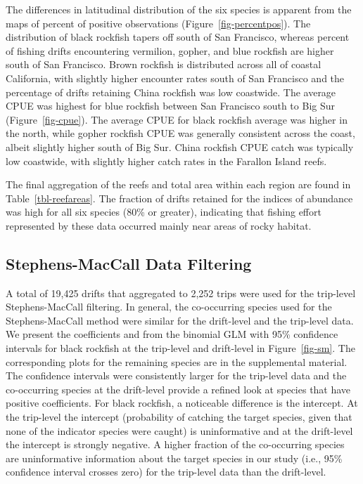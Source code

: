 \documentclass[
  12pt,
  authoryear,
  preprint,
  3p]{elsarticle}
\begin{document}
The differences in latitudinal distribution of the six species is
apparent from the maps of percent of positive observations
(Figure~\ref{fig-percentpos}). The distribution of black rockfish tapers
off south of San Francisco, whereas percent of fishing drifts
encountering vermilion, gopher, and blue rockfish are higher south of
San Francisco. Brown rockfish is distributed across all of coastal
California, with slightly higher encounter rates south of San Francisco
and the percentage of drifts retaining China rockfish was low coastwide.
The average CPUE was highest for blue rockfish between San Francisco
south to Big Sur (Figure~\ref{fig-cpue}). The average CPUE for black
rockfish average was higher in the north, while gopher rockfish CPUE was
generally consistent across the coast, albeit slightly higher south of
Big Sur. China rockfish CPUE catch was typically low coastwide, with
slightly higher catch rates in the Farallon Island reefs.

The final aggregation of the reefs and total area within each region are
found in Table~\ref{tbl-reefareas}. The fraction of drifts retained for
the indices of abundance was high for all six species (80\% or greater),
indicating that fishing effort represented by these data occurred mainly
near areas of rocky habitat.

\hypertarget{stephens-maccall-data-filtering-1}{%
\subsection{Stephens-MacCall Data
Filtering}\label{stephens-maccall-data-filtering-1}}

A total of 19,425 drifts that aggregated to 2,252 trips were used for
the trip-level Stephens-MacCall filtering. In general, the co-occurring
species used for the Stephens-MacCall method were similar for the
drift-level and the trip-level data. We present the coefficients and
from the binomial GLM with 95\% confidence intervals for black rockfish
at the trip-level and drift-level in Figure~\ref{fig-sm}. The
corresponding plots for the remaining species are in the supplemental
material. The confidence intervals were consistently larger for the
trip-level data and the co-occurring species at the drift-level provide
a refined look at species that have positive coefficients. For black
rockfish, a noticeable difference is the intercept. At the trip-level
the intercept (probability of catching the target species, given that
none of the indicator species were caught) is uninformative and at the
drift-level the intercept is strongly negative. A higher fraction of the
co-occurring species are uninformative information about the target
species in our study (i.e., 95\% confidence interval crosses zero) for
the trip-level data than the drift-level.
\end{document}
